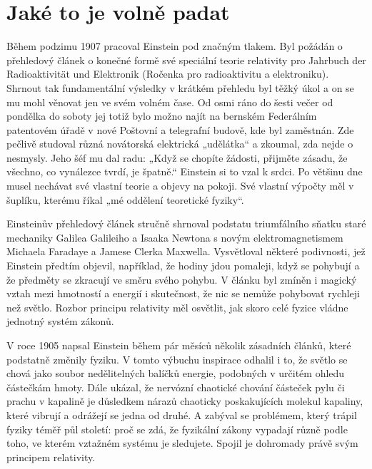\section{Jaké to je volně padat}\label{feyIchIIIsecII}
  Během podzimu 1907 pracoval Einstein pod značným tlakem. Byl požádán o přehledový článek o konečné
  formě své speciální teorie relativity pro Jahrbuch der Radioaktivität und Elektronik (Ročenka pro
  radioaktivitu a elektroniku). Shrnout tak fundamentální výsledky v krátkém přehledu byl těžký úkol
  a on se mu mohl věnovat jen ve svém volném čase. Od osmi ráno do šesti večer od pondělka do soboty
  jej totiž bylo možno najít na bernském Federálním patentovém úřadě v nové Poštovní a telegrafní
  budově, kde byl zaměstnán. Zde pečlivě studoval různá novátorská elektrická „udělátka“ a zkoumal,
  zda nejde o nesmysly. Jeho šéf mu dal radu: „Když se chopíte žádosti, přijměte zásadu, že všechno,
  co vynálezce tvrdí, je špatně.“ Einstein si to vzal k srdci. Po většinu dne musel nechávat své
  vlastní teorie a objevy na pokoji. Své vlastní výpočty měl v šuplíku, kterému říkal „mé oddělení
  teoretické fyziky“. 

  Einsteinův přehledový článek stručně shrnoval podstatu triumfálního sňatku staré mechaniky Galilea
  Galileiho a Isaaka Newtona s novým elektromagnetismem Michaela Faradaye a Jamese Clerka Maxwella.
  Vysvětloval některé podivnosti, jež Einstein předtím objevil, například, že hodiny jdou pomaleji,
  když se pohybují a že předměty se zkracují ve směru svého pohybu. V článku byl zmíněn i magický
  vztah mezi hmotností a energií i skutečnost, že nic se nemůže pohybovat rychleji než světlo.
  Rozbor principu relativity měl osvětlit, jak skoro celé fyzice vládne jednotný systém zákonů.  

  V roce 1905 napsal Einstein během pár měsíců několik zásadních článků, které podstatně změnily
  fyziku. V tomto výbuchu inspirace odhalil i to, že světlo se chová jako soubor nedělitelných
  balíčků energie, podobných v určitém ohledu částečkám hmoty. Dále ukázal, že nervózní chaotické
  chování částeček pylu či prachu v kapalině je důsledkem nárazů chaoticky poskakujících molekul
  kapaliny, které vibrují a odrážejí se jedna od druhé. A zabýval se problémem, který trápil fyziky
  téměř půl století: proč se zdá, že fyzikální zákony vypadají různě podle toho, ve kterém vztažném
  systému je sledujete. Spojil je dohromady právě svým principem relativity. 

